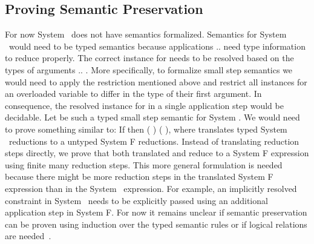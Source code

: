 \subsection{Proving Semantic Preservation}
For now System \Fo\ does not have semantics formalized.
Semantics for System \Fo\ would need to be typed semantics because applications     $..$   need type information to reduce properly.
The correct instance for  needs to be resolved based on the types of arguments  $..$ . 
More specifically, to formalize small step semantics we would need to apply the restriction mentioned above and restrict all instances for an overloaded variable  to differ in the type of their first argument. In consequence, the resolved instance for  in a single application step     would be decidable.
Let    be such a typed small step semantic for System \Fo. We would need to prove something similar to: If    then  \Constr{[}  \Constr{]} (   )  (   ), where  translates typed System \Fo\ reductions to a untyped System F reductions.
Instead of translating reduction steps directly, we prove that both translated  and  reduce to a System F expression  using finite many reduction steps.
This more general formulation is needed because there might be more reduction steps in the translated System F expression than in the System \Fo\ expression. 
For example, an implicitly resolved constraint in System \Fo\ needs to be explicitly passed using an additional application step in System F. 
For now it remains unclear if semantic preservation can be proven using induction over the typed semantic rules or if logical relations are needed~\cite{logrel}.

